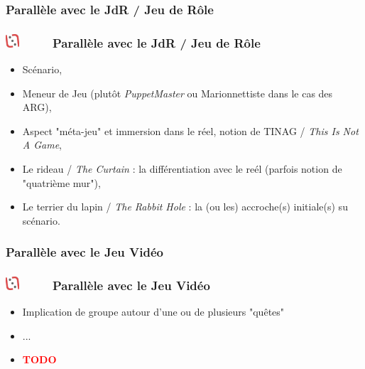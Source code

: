 \documentclass[slidetop,11pt]{beamer}
\def\sectionPartIIcII{Parall{\`e}le avec le JdR / Jeu de R{\^o}le}
\def\sectionPartIIcIII{Parall{\`e}le avec le Jeu Vid{\'e}o}
\def\moreInFrameTitleLeftt{\includegraphics[height=0.5cm]{img/ligueludique-0.png}~~~~~}
\begin{document}
\subsubsection{\sectionPartIIcII} %
\begin{frame}
	\frametitle{\moreInFrameTitleLeftt \sectionPartIIcII }
	\begin{itemize}
		\item Sc{\'e}nario, 
		\item Meneur de Jeu (plut{\^o}t \emph{PuppetMaster} ou Marionnettiste dans le cas des ARG), 
		\item Aspect "m{\'e}ta-jeu" et immersion dans le r{\'e}el, notion de TINAG / \emph{This Is Not A Game}, 
		\item Le rideau / \emph{The Curtain} : la diff{\'e}rentiation avec le re{\'e}l (parfois notion de "quatri{\`e}me mur"), 
		\item Le terrier du lapin / \emph{The Rabbit Hole} : la (ou les) accroche(s) initiale(s) su sc{\'e}nario. 
	\end{itemize}
\end{frame} 

\subsubsection{\sectionPartIIcIII} %
\begin{frame}
	\frametitle{\moreInFrameTitleLeftt \sectionPartIIcIII }
	\begin{itemize}
		\item Implication de groupe autour d'une ou de plusieurs "qu{\^e}tes"
		\item[] ...
		\item \textcolor{red}{ \textbf{TODO} }
	\end{itemize}
\end{frame} 
\end{document}
